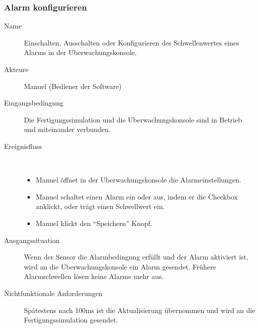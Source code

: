 \documentclass[parskip=full]{scrartcl}
\begin{document}
\subsubsection{Alarm konfigurieren}
\begin{description}
  \item[Name] Einschalten, Ausschalten oder Konfigurieren des Schwellenwertes eines Alarms in der \gls{Uberwachungskonsole}.
  \item[Akteure] Manuel (Bediener der Software)
  \item[Eingangsbedingung] Die \gls{Fertigungssimulation} und die \gls{Uberwachungskonsole} sind in Betrieb und miteinander verbunden.
  \item[Ereignisfluss]~\\
  \begin{itemize}[noitemsep]
    \item Manuel \"offnet in der \gls{Uberwachungskonsole} die Alarmeinstellungen.
    \item Manuel schaltet einen Alarm ein oder aus, indem er die Checkbox anklickt, oder trägt einen Schwellwert ein.
    \item Manuel klickt den "`Speichern"' Knopf.
  \end{itemize}
  \item[Ausgangssituation] Wenn der Sensor die Alarmbedingung erf\"ullt und der Alarm aktiviert ist, wird an die \gls{Uberwachungskonsole} ein Alarm gesendet.
  Frühere Alarmschwellen lösen keine Alarme mehr aus.
  \item [Nichtfunktionale Anforderungen] Sp\"atestens nach 100ms ist die Aktualisierung \"ubernommen und wird
    an die \gls{Fertigungssimulation} gesendet.
\end{description}
\end{document}
